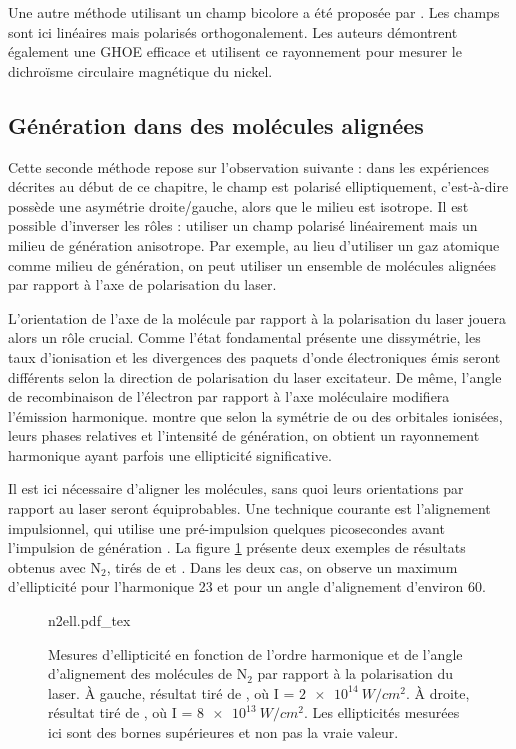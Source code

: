 Une autre méthode utilisant un champ bicolore a été proposée par . Les champs sont ici linéaires mais polarisés orthogonalement. Les auteurs démontrent également une GHOE efficace et utilisent ce rayonnement pour mesurer le dichroïsme circulaire magnétique du nickel.


\subsection{Génération dans des molécules alignées}
Cette seconde méthode repose sur l'observation suivante : dans les expériences décrites au début de ce chapitre, le champ est polarisé elliptiquement, c'est-à-dire possède une asymétrie droite/gauche, alors que le milieu est isotrope. Il est possible d'inverser les rôles : utiliser un champ polarisé linéairement mais un milieu de génération anisotrope. Par exemple, au lieu d'utiliser un gaz atomique comme milieu de génération, on peut utiliser un ensemble de molécules alignées par rapport à l'axe de polarisation du laser.

L'orientation de l'axe de la molécule par rapport à la polarisation du laser jouera alors un rôle crucial. Comme l'état fondamental présente une dissymétrie, les taux d'ionisation et les divergences des paquets d'onde électroniques émis seront différents selon la direction de polarisation du laser excitateur. De même, l'angle de recombinaison de l'électron par rapport à l'axe moléculaire modifiera l'émission harmonique.  montre que selon la symétrie de ou des orbitales ionisées, leurs phases relatives et l'intensité de génération, on obtient un rayonnement harmonique ayant parfois une ellipticité significative. \par
Il est ici nécessaire d'aligner les molécules, sans quoi leurs orientations par rapport au laser seront équiprobables. Une technique courante est l'alignement impulsionnel, qui utilise une pré-impulsion quelques picosecondes avant l'impulsion de génération . La figure \ref{fig:n2ell} présente deux exemples de résultats obtenus avec $\text{N}_\text{2}$, tirés de  et . Dans les deux cas, on observe un maximum d'ellipticité pour l'harmonique 23 et pour un angle d'alignement d'environ 60\degres.

\begin{figure}[!ht]
\centering
\def\svgwidth{1\columnwidth}
{n2ell.pdf_tex}
\caption{Mesures d'ellipticité en fonction de l'ordre harmonique et de l'angle d'alignement des molécules de $\text{N}_\text{2}$ par rapport à la polarisation du laser. \`{A} gauche, résultat tiré de , où I = $\SI{2e14}{W/cm^2}$. \`{A} droite, résultat tiré de , où I = $\SI{8e13}{W/cm^2}$. Les ellipticités mesurées ici sont des bornes supérieures et non pas la vraie valeur.}
\label{fig:n2ell}
\end{figure}

